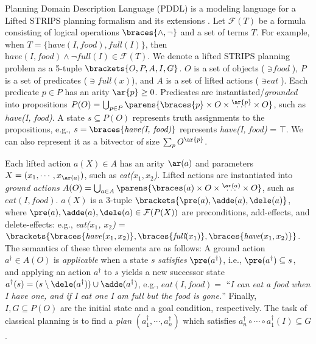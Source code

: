 Planning Domain Description Language (PDDL) is a modeling language for
a Lifted STRIPS planning formalism \citep{FikesHN72} and its extensions \citep{pddlbook}.
Let $\mathcal{F}(T)$ be a formula consisting of
 logical operations $\braces{\land,\lnot}$
and a set of terms $T$.
For example, when $T=\{\textit{have}(\textit{I}, \textit{food}), \textit{full}(\textit{I})\}$,
 then $\textit{have}(\textit{I}, \textit{food})\land\lnot\textit{full}(\textit{I})\in \mathcal{F}(T)$.
We denote a lifted STRIPS planning problem
as a 5-tuple $\brackets{O,P,A,I,G}$.
 $O$ is a set of objects ($\ni\textit{food}$),
 $P$ is a set of predicates ($\ni\textit{full}(x)$), and
 $A$ is a set of lifted actions ($\ni\textit{eat}$).
Each predicate $p\in P$ has an arity $\ar{p}\geq 0$.
Predicates are instantiated/\emph{grounded} into
propositions $P(O)=\bigcup_{p\in P} \parens{\braces{p}\times O\times\overset{\ar{p}}{\ldots}\times O}$,
such as \textit{have(I, food)}.
A state $s\subseteq P(O)$ represents truth assignments to the propositions,
e.g., $s=\braces{\textit{have(I, food)}}$ represents \textit{have(I, food)} = $\top$. %
We can also represent it as a bitvector of size $\sum_p O^{\ar{p}}$.

Each lifted action $a(X)\in A$ has an arity $\ar(a)$
and parameters $X=(x_1,\cdots,x_{\ar(a)})$, such as \textit{eat($x_1, x_2$)}.
Lifted actions are instantiated into 
\emph{ground actions} $A(O)=\bigcup_{a\in A} \parens{\braces(a)\times O\times\overset{\ar(a)}{\ldots}\times O}$,
such as $\textit{eat}(\textit{I},\textit{food})$.
$a(X)$ is a 3-tuple $\brackets{\pre(a),\adde(a),\dele(a)}$, where
 $\pre(a), \adde(a), \dele(a) \in \mathcal{F}(P(X))$ are
 preconditions, add-effects, and delete-effects:
e.g., \textit{eat($x_1$, $x_2$)} = $\brackets{\braces{\textit{have}(x_1, x_2)}, \braces{\textit{full}(x_1)}, \braces{\textit{have}(x_1,x_2)}}$.
The semantics of these three elements are as follows:
A ground action $a^{\dagger}\in A(O)$ is \emph{applicable} when a state $s$ \emph{satisfies} $\pre(a^{\dagger})$, i.e., $\pre(a^{\dagger})\subseteq s$,
and applying an action $a^{\dagger}$ to $s$ yields a new successor state
$a^{\dagger}(s) = (s \setminus \dele(a^{\dagger})) \cup \adde(a^{\dagger})$,
e.g., $\textit{eat}(\textit{I},\textit{food})=$ ``\emph{I can eat a food when I have one, and if I eat one I am full but the food is gone.}''
Finally,
$I,G\subseteq P(O)$ are the initial state and a goal condition, respectively.
The task of classical planning is to find a \emph{plan} $(a^{\dagger}_1,\cdots,a^{\dagger}_n)$
which satisfies $a^{\dagger}_n \circ \cdots \circ a^{\dagger}_1(I) \subseteq G$.
